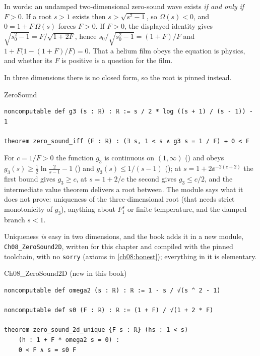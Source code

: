 In words: an undamped two-dimensional zero-sound wave exists \emph{if and only if} $F>0$.
If a root $s>1$ exists then $s>\sqrt{s^2-1}$, so $\Omega(s)<0$, and $0=1+F\,\Omega(s)$ forces $F>0$.
If $F>0$, the displayed identity gives $\sqrt{s_0^2-1}=F/\sqrt{1+2F}$, hence $s_0/\sqrt{s_0^2-1}=(1+F)/F$ and $1+F\bigl(1-(1+F)/F\bigr)=0$.
That a helium film obeys the equation is physics, and whether its $F$ is positive is a question for the film.

In three dimensions there is no closed form, so the root is pinned instead.

\begin{leanbox}{ZeroSound}
\begin{lstlisting}[style=lean]
noncomputable def g3 (s : ℝ) : ℝ := s / 2 * log ((s + 1) / (s - 1)) - 1

theorem zero_sound_iff (F : ℝ) : (∃ s, 1 < s ∧ g3 s = 1 / F) ↔ 0 < F
\end{lstlisting}
\end{leanbox}

For $c=1/F>0$ the function $g_3$ is continuous on $(1,\infty)$ () and obeys $g_3(s)\ge\frac12\ln\frac2{s-1}-1$ () and $g_3(s)\le1/(s-1)$ (); at $s=1+2\ee^{-2(c+2)}$ the first bound gives $g_3\ge c$, at $s=1+2/c$ the second gives $g_3\le c/2$, and the intermediate value theorem delivers a root between.
The module says what it does not prove: uniqueness of the three-dimensional root (that needs strict monotonicity of $g_3$), anything about $F_1^s$ or finite temperature, and the damped branch $s<1$.

Uniqueness \emph{is} easy in two dimensions, and the book adds it in a new module, \texttt{Ch08\_ZeroSound2D}, written for this chapter and compiled with the pinned toolchain, with no \texttt{sorry} (axioms in \cref{ch08:honest}); everything in it is elementary.

\begin{leanbox}{Ch08\_ZeroSound2D (new in this book)}
\begin{lstlisting}[style=lean]
noncomputable def omega2 (s : ℝ) : ℝ := 1 - s / √(s ^ 2 - 1)

noncomputable def s0 (F : ℝ) : ℝ := (1 + F) / √(1 + 2 * F)

theorem zero_sound_2d_unique {F s : ℝ} (hs : 1 < s)
    (h : 1 + F * omega2 s = 0) :
    0 < F ∧ s = s0 F
\end{lstlisting}
\end{leanbox}

